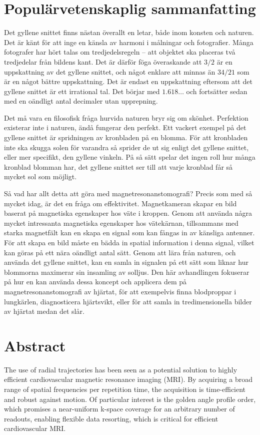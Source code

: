 \documentclass[11pt,twoside,openright]{book}
\begin{document}
\chapter*{Populärvetenskaplig sammanfatting}
\thispagestyle{empty}
Det gyllene snittet finns nästan överallt en letar, både inom konsten och naturen. Det är känt för att inge en känsla av harmoni i målningar och fotografier. Många fotografer har hört talas om tredjedelsregeln – att objektet ska placeras två tredjedelar från bildens kant. Det är därför föga överaskande att $3/2$ är en uppskattning av det gyllene snittet, och något enklare att minnas än $34/21$ som är en något bättre uppskattning. Det är endast en uppskattning eftersom att det gyllene snittet är ett irrational tal. Det börjar med $1.618\dots$ och fortsätter sedan med en oändligt antal decimaler utan upprepning.

Det må vara en filosofisk fråga hurvida naturen bryr sig om skönhet. Perfektion existerar inte i naturen, ändå fungerar den perfekt. Ett vackert exempel på det gyllene snittet är spridningen av kronbladen på en blomma. För att kronbladen inte ska skugga solen för varandra så sprider de ut sig enligt det gyllene snittet, eller mer specifikt, den gyllene vinkeln. På så sätt spelar det ingen roll hur många kronblad blomman har, det gyllene snittet ser till att varje kronblad får så mycket sol som möjligt.

Så vad har allt detta att göra med magnetresonanstomografi? Precis som med så mycket idag, är det en fråga om effektivitet. Magnetkameran skapar en bild baserat på magnetiska egenskaper hos väte i kroppen. Genom att använda några mycket intressanta magnetiska egenskaper hos vätekärnan, tillsammans med starka magnetfält kan en skapa en signal som kan fångas in av känsliga antenner. För att skapa en bild måste en bädda in spatial information i denna signal, vilket kan göras på ett nära oändligt antal sätt. Genom att lära från naturen, och använda det gyllene snittet, kan en samla in signalen på ett sätt som liknar hur blommorna maximerar sin insamling av solljus. Den här avhandlingen fokuserar på hur en kan använda dessa koncept och applicera dem på magnetresonanstomografi av hjärtat, för att exempelvis finna blodproppar i lungkärlen, diagnosticera hjärtsvikt, eller för att samla in tredimensionella bilder av hjärtat medan det slår.

\chapter*{Abstract}
\thispagestyle{empty}
The use of radial trajectories has been seen as a potential solution to highly efficient cardiovascular magnetic resonance imaging (MRI). By acquiring a broad range of spatial frequencies per repetition time, the acquisition is time-efficient and robust against motion. Of particular interest is the golden angle profile order, which promises a near-uniform k-space coverage for an arbitrary number of readouts, enabling flexible data resorting, which is critical for efficient cardiovascular MRI.
\end{document}
